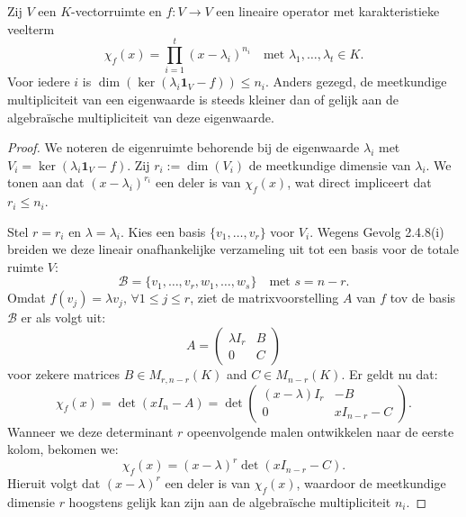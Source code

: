 \begin{lemma}[6.3.9]
    Zij $V$ een $K$-vectorruimte en $f \colon V \to V$ een lineaire operator met karakteristieke veelterm
    \[ \chi_f(x) = \prod_{i=1}^t (x - \lambda_i)^{n_i} \quad \text{met } \lambda_1, \dots, \lambda_t \in K. \]
    Voor iedere $i$ is $\dim(\operatorname{ker}(\lambda_i \mathbf{1}_V - f)) \le n_i$. Anders gezegd, de meetkundige multipliciteit van een eigenwaarde is steeds kleiner dan of gelijk aan de algebraïsche multipliciteit van deze eigenwaarde.
\end{lemma}
\begin{proof}
    We noteren de eigenruimte behorende bij de eigenwaarde $\lambda_i$ met $V_i = \ker(\lambda_i \mathbf{1}_V - f)$.
     Zij $r_i := \dim(V_i)$ de meetkundige dimensie van $\lambda_i$.
      We tonen aan dat $(x-\lambda_i)^{r_i}$ een deler is van $\chi_f(x)$,
      wat direct impliceert dat $r_i \le n_i$.

    Stel $r = r_i$ en $\lambda = \lambda_i$.
     Kies een basis $\{v_1, \dots, v_r\}$ voor $V_i$.
      Wegens Gevolg 2.4.8(i) breiden we deze lineair onafhankelijke verzameling uit tot een basis voor de totale ruimte $V$:
    \[ \mathcal{B} = \{v_1, \dots, v_r, w_1, \dots, w_s\} \quad \text{met } s = n - r. \]
    Omdat $f(v_j) = \lambda v_j , \, \forall 1 \le j \le r$,
    ziet de matrixvoorstelling $A$ van $f$ tov de basis $\mathcal{B}$ er als volgt uit:
    \[ A = \begin{pmatrix} \lambda I_r & B \\ 0 & C \end{pmatrix} \]
    voor zekere matrices $B \in M_{r,n-r}(K)$ and $C \in M_{n-r}(K)$. Er geldt nu dat:
    \[ \chi_f(x) = \det(x I_n - A) = \det \begin{pmatrix} (x - \lambda) I_r & -B \\ 0 & x I_{n-r} - C \end{pmatrix}. \]
    Wanneer we deze determinant $r$ opeenvolgende malen ontwikkelen naar de eerste kolom, bekomen we:
    \[ \chi_f(x) = (x - \lambda)^r \det(x I_{n-r} - C). \]
    Hieruit volgt dat $(x - \lambda)^r$ een deler is van $\chi_f(x)$, waardoor de meetkundige dimensie $r$ hoogstens gelijk kan zijn aan de algebraïsche multipliciteit $n_i$.
\end{proof}

